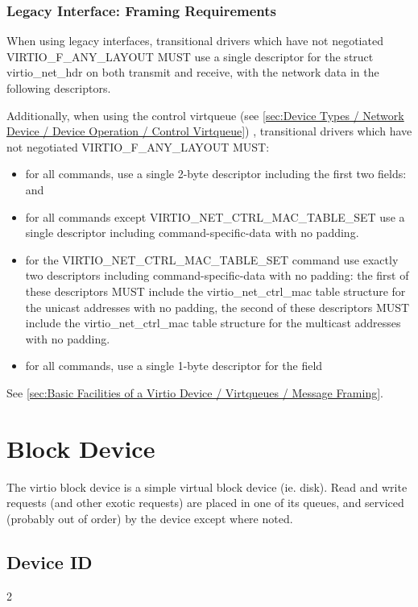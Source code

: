 \subsubsection{Legacy Interface: Framing Requirements}\label{sec:Device
Types / Network Device / Legacy Interface: Framing Requirements}

When using legacy interfaces, transitional drivers which have not
negotiated VIRTIO_F_ANY_LAYOUT MUST use a single descriptor for the
struct virtio_net_hdr on both transmit and receive, with the
network data in the following descriptors.

Additionally, when using the control virtqueue (see \ref{sec:Device
Types / Network Device / Device Operation / Control Virtqueue})
, transitional drivers which have not
negotiated VIRTIO_F_ANY_LAYOUT MUST:
\begin{itemize}
\item for all commands, use a single 2-byte descriptor including the first two
fields:  and 
\item for all commands except VIRTIO_NET_CTRL_MAC_TABLE_SET
use a single descriptor including command-specific-data
with no padding.
\item for the VIRTIO_NET_CTRL_MAC_TABLE_SET command use exactly
two descriptors including command-specific-data with no padding:
the first of these descriptors MUST include the
virtio_net_ctrl_mac table structure for the unicast addresses with no padding,
the second of these descriptors MUST include the
virtio_net_ctrl_mac table structure for the multicast addresses
with no padding.
\item for all commands, use a single 1-byte descriptor for the
 field
\end{itemize}

See \ref{sec:Basic
Facilities of a Virtio Device / Virtqueues / Message Framing}.

\section{Block Device}\label{sec:Device Types / Block Device}

The virtio block device is a simple virtual block device (ie.
disk). Read and write requests (and other exotic requests) are
placed in one of its queues, and serviced (probably out of order) by the
device except where noted.

\subsection{Device ID}\label{sec:Device Types / Block Device / Device ID}
  2

